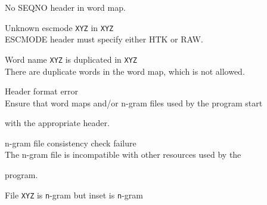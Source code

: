 \begin{itemize}
\begin{itemize}
        No SEQNO header in word map.





 Unknown escmode \texttt{XYZ} in \texttt{XYZ}\\


        ESCMODE header must specify either HTK or RAW.





 Word name \texttt{XYZ} is duplicated in \texttt{XYZ}\\


        There are duplicate words in the word map, which is not allowed.





\end{itemize}















\begin{itemize}


   Header format error\\


        Ensure that word maps and/or n-gram files used by the program start


        with the appropriate header.


\end{itemize}















\begin{itemize}


   n-gram file consistency check failure\\


        The n-gram file is incompatible with other resources used by the


        program.





   File \texttt{XYZ} is \texttt{n}-gram but inset is \texttt{n}-gram\\



\end{itemize}
\end{itemize}
